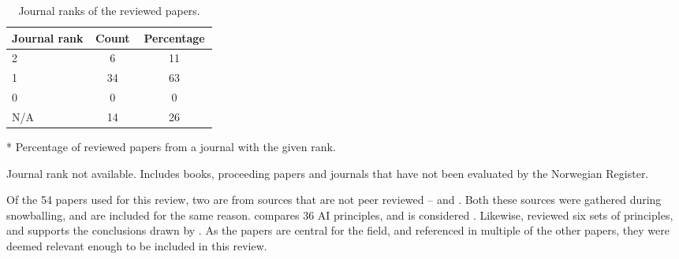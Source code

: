 \begin{table}[htpb]
    \centering
    \caption{Journal ranks of the reviewed papers.}
    \label{tab:summary-ranks}
    \begin{threeparttable}
    \begin{tabular}{p{0.4\linewidth}cc}
    \toprule
        \textbf{Journal rank} & \textbf{Count} & \textbf{Percentage}\tnote{*} \\
    \midrule
        2                       & 6     & 11    \\
        1                       & 34    & 63    \\
        0                       & 0     & 0     \\
        N/A\tnote{\textdagger}  & 14    & 26    \\
    \bottomrule
    \end{tabular}
    \begin{tablenotes}
        \footnotesize
        \item [*] Percentage of reviewed papers from a journal with the given rank.
        \item [\textdagger] Journal rank not available. Includes books, proceeding papers and journals that have not been evaluated by the Norwegian Register.
    \end{tablenotes}
\end{threeparttable}
\end{table}

Of the 54 papers used for this review, two are from sources that are not peer reviewed -- \textcite{Fjeld_2020} and \textcite{Floridi_2019}. Both these sources were gathered during snowballing, and are included for the same reason. \textcite{Fjeld_2020} compares 36 AI principles, and is considered  \parencite[p.~2]{Bélisle-Pipon_2022}. Likewise, \textcite{Floridi_2019} reviewed six sets of principles, and supports the conclusions drawn by \textcite{Floridi_2018}. As the papers are central for the field, and referenced in multiple of the other papers, they were deemed relevant enough to be included in this review.


